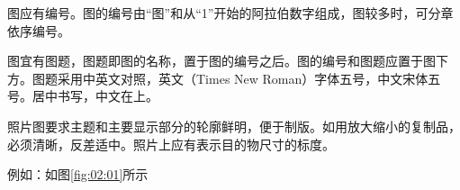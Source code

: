 图应有编号。图的编号由“图”和从“1”开始的阿拉伯数字组成，图较多时，可分章依序编号。

图宜有图题，图题即图的名称，置于图的编号之后。图的编号和图题应置于图下方。图题采用中英文对照，英文（Times New Roman）字体五号，中文宋体五号。居中书写，中文在上。

照片图要求主题和主要显示部分的轮廓鲜明，便于制版。如用放大缩小的复制品，必须清晰，反差适中。照片上应有表示目的物尺寸的标度。

例如：如图\ref{fig:02:01}所示
\begin{figure}[h]
\setlength{\belowcaptionskip}{-0.2cm} 
 \centering
 \addtocounter{subfigure}{-1}

\end{figure}
